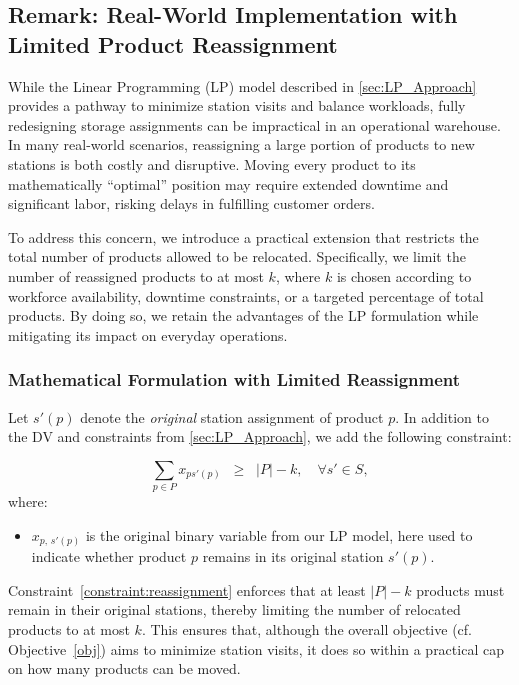 \documentclass[11pt]{elsarticle}
\begin{document}
\subsection{\textbf{Remark: Real-World Implementation with Limited Product Reassignment}}
\label{sec:limited_reassignment}

\noindent

While the Linear Programming (LP) model described in \cref{sec:LP_Approach} provides a pathway to minimize station visits and balance workloads, fully redesigning storage assignments can be impractical in an operational warehouse. In many real-world scenarios, reassigning a large portion of products to new stations is both costly and disruptive. Moving every product to its mathematically “optimal” position may require extended downtime and significant labor, risking delays in fulfilling customer orders.

To address this concern, we introduce a practical extension that restricts the total number of products allowed to be relocated. Specifically, we limit the number of reassigned products to at most \(k\), where \(k\) is chosen according to workforce availability, downtime constraints, or a targeted percentage of total products. By doing so, we retain the advantages of the LP formulation while mitigating its impact on everyday operations.

\subsubsection{Mathematical Formulation with Limited Reassignment}
Let \(s'(p)\) denote the \emph{original} station assignment of product \(p\). In addition to the DV and constraints from \cref{sec:LP_Approach}, we add the following constraint:

\begin{equation}
\sum_{p \in P} x_{ps'(p)} \;\;\ge\;\; |P| - k, \quad \forall s' \in S,
\label{constraint:reassignment}
\end{equation}
where:
\begin{itemize}
    \item \(x_{p,\,s'(p)}\) is the original binary variable from our LP model, here used to indicate whether product \(p\) remains in its original station \(s'(p)\).
\end{itemize}

Constraint~\eqref{constraint:reassignment} enforces that at least \(|P| - k\) products must remain in their original stations, thereby limiting the number of relocated products to at most \(k\). This ensures that, although the overall objective (cf. Objective~\eqref{obj}) aims to minimize station visits, it does so within a practical cap on how many products can be moved.
\end{document}
